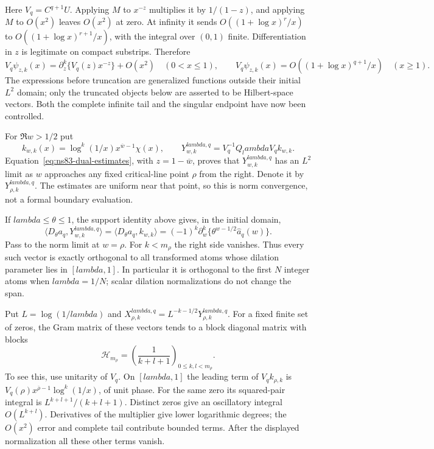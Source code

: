 \documentclass[11pt]{article}
\def\lambda{lambda}%
\theoremstyle{remark}
\begin{document}
Here $V_q=C^{q+1}U$. Applying $M$ to $x^{-z}$ multiplies it by
$1/(1-z)$, and applying $M$ to $O(x^2)$ leaves $O(x^2)$ at zero.
At infinity it sends $O((1+\log x)^r/x)$ to
$O((1+\log x)^{r+1}/x)$, with the integral over $(0,1)$ finite.
Differentiation in $z$ is legitimate on compact substrips. Therefore
\begin{equation}
 V_q\psi_{z,k}(x)=\partial_z^k\{V_q(z)x^{-z}\}+O(x^2)
                      \quad(0<x\leq1),\qquad
 V_q\psi_{z,k}(x)=O((1+\log x)^{q+1}/x)\quad(x\geq1).
 \label{eq:ns83-dual-estimates}
\end{equation}
The expressions before truncation are generalized functions outside their
initial $L^2$ domain; only the truncated objects below are asserted to be
Hilbert-space vectors. Both the complete infinite tail and the singular
endpoint have now been controlled.

For $\Re w>1/2$ put
\[
 k_{w,k}(x)=\log^k(1/x)x^{\overline w-1}\chi(x),\qquad
 Y^{\lambda,q}_{w,k}=V_q^{-1}Q_\lambda V_q k_{w,k}.
\]
Equation~\eqref{eq:ns83-dual-estimates}, with $z=1-\overline w$,
proves that $Y^{\lambda,q}_{w,k}$ has an $L^2$ limit as $w$ approaches
any fixed critical-line point $\rho$ from the right. Denote it by
$Y^{\lambda,q}_{\rho,k}$. The estimates are uniform near that point,
so this is norm convergence, not a formal boundary evaluation.

If $\lambda\leq\theta\leq1$, the support identity above gives, in
the initial domain,
\[
 \langle D_\theta a_q,Y^{\lambda,q}_{w,k}\rangle
 =\langle D_\theta a_q,k_{w,k}\rangle
 =(-1)^k\partial_w^k\{\theta^{w-1/2}\widehat a_q(w)\}.
\]
Pass to the norm limit at $w=\rho$. For $k<m_\rho$ the right side
vanishes. Thus every such vector is exactly orthogonal to all
transformed atoms whose dilation parameter lies in $[\lambda,1]$.
In particular it is orthogonal to the first $N$ integer atoms when
$\lambda=1/N$; scalar dilation normalizations do not change the span.

Put $L=\log(1/\lambda)$ and
$X^{\lambda,q}_{\rho,k}=L^{-k-1/2}Y^{\lambda,q}_{\rho,k}$.
For a fixed finite set of zeros, the Gram matrix of these vectors tends
to a block diagonal matrix with blocks
\begin{equation}
 \mathcal H_{m_\rho}=\left(\frac1{k+l+1}\right)_{0\leq k,l<m_\rho}.
 \label{eq:ns83-hilbert-blocks}
\end{equation}
To see this, use unitarity of $V_q$. On $[\lambda,1]$ the leading
term of $V_q k_{\rho,k}$ is
$V_q(\rho)x^{\overline\rho-1}\log^k(1/x)$, of unit phase.
For the same zero its squared-pair integral is
$L^{k+l+1}/(k+l+1)$. Distinct zeros give an oscillatory integral
$O(L^{k+l})$. Derivatives of the multiplier give lower logarithmic
degrees; the $O(x^2)$ error and complete tail contribute bounded terms.
After the displayed normalization all these other terms vanish.
\end{document}
